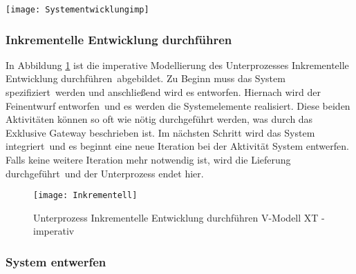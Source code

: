 \begin{sidewaysfigure}[!htbp]
\begin{center}
  \texttt{[image: Systementwicklungimp]} %
  \caption{Systementwicklungsprojekt AG/AN  V-Modell XT - imperativ}
  \label{fig:Systementwicklungimp}
\end{center}
\end{sidewaysfigure}




\subsubsection{Inkrementelle Entwicklung durchführen}
In Abbildung \ref{fig:Inkrementell} ist die imperative Modellierung des Unterprozesses \grqq Inkrementelle Entwicklung durchführen\grqq \ abgebildet. \newline
Zu Beginn muss das \grqq System spezifiziert\grqq \ werden und anschließend wird es entworfen. \newline
Hiernach wird der \grqq Feinentwurf entworfen\grqq \ und es werden die \grqq Systemelemente realisiert\grqq. Diese beiden Aktivitäten können so oft wie nötig durchgeführt werden, was durch das Exklusive Gateway beschrieben ist.  \newline
Im nächsten Schritt wird das \grqq System integriert\grqq \ und es beginnt eine neue Iteration bei der Aktivität \grqq System entwerfen\grqq .\newline
Falls keine weitere Iteration mehr notwendig ist, wird die \grqq Lieferung durchgeführt\grqq \ und der Unterprozess endet hier. \newline

\begin{figure}[!htbp]
\begin{center}
  \texttt{[image: Inkrementell]} %
  \caption{Unterprozess Inkrementelle Entwicklung durchführen V-Modell XT - imperativ}
  \label{fig:Inkrementell}
\end{center}
\end{figure}



\clearpage


\subsubsection{System entwerfen}

